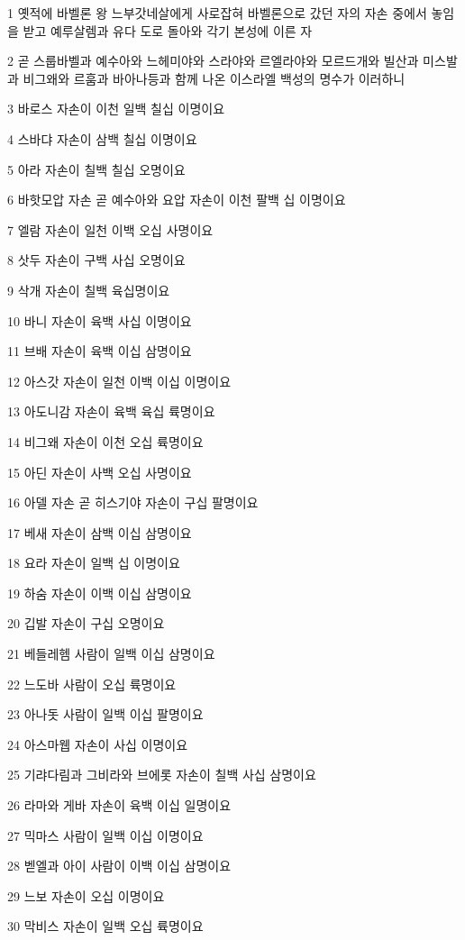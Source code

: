 \par 1 옛적에 바벨론 왕 느부갓네살에게 사로잡혀 바벨론으로 갔던 자의 자손 중에서 놓임을 받고 예루살렘과 유다 도로 돌아와 각기 본성에 이른 자
\par 2 곧 스룹바벨과 예수아와 느헤미야와 스라야와 르엘라야와 모르드개와 빌산과 미스발과 비그왜와 르훔과 바아나등과 함께 나온 이스라엘 백성의 명수가 이러하니
\par 3 바로스 자손이 이천 일백 칠십 이명이요
\par 4 스바댜 자손이 삼백 칠십 이명이요
\par 5 아라 자손이 칠백 칠십 오명이요
\par 6 바핫모압 자손 곧 예수아와 요압 자손이 이천 팔백 십 이명이요
\par 7 엘람 자손이 일천 이백 오십 사명이요
\par 8 삿두 자손이 구백 사십 오명이요
\par 9 삭개 자손이 칠백 육십명이요
\par 10 바니 자손이 육백 사십 이명이요
\par 11 브배 자손이 육백 이십 삼명이요
\par 12 아스갓 자손이 일천 이백 이십 이명이요
\par 13 아도니감 자손이 육백 육십 륙명이요
\par 14 비그왜 자손이 이천 오십 륙명이요
\par 15 아딘 자손이 사백 오십 사명이요
\par 16 아델 자손 곧 히스기야 자손이 구십 팔명이요
\par 17 베새 자손이 삼백 이십 삼명이요
\par 18 요라 자손이 일백 십 이명이요
\par 19 하숨 자손이 이백 이십 삼명이요
\par 20 깁발 자손이 구십 오명이요
\par 21 베들레헴 사람이 일백 이십 삼명이요
\par 22 느도바 사람이 오십 륙명이요
\par 23 아나돗 사람이 일백 이십 팔명이요
\par 24 아스마웹 자손이 사십 이명이요
\par 25 기랴다림과 그비라와 브에롯 자손이 칠백 사십 삼명이요
\par 26 라마와 게바 자손이 육백 이십 일명이요
\par 27 믹마스 사람이 일백 이십 이명이요
\par 28 벧엘과 아이 사람이 이백 이십 삼명이요
\par 29 느보 자손이 오십 이명이요
\par 30 막비스 자손이 일백 오십 륙명이요
